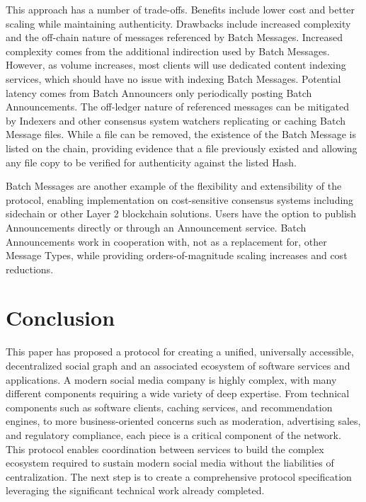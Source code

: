 \documentclass[12pt,letterpaper]{article}
\begin{document}
	This approach has a number of trade-offs. Benefits include lower cost and better
        scaling while maintaining authenticity. Drawbacks include increased complexity and
        the off-chain nature of messages referenced by Batch Messages. Increased complexity
        comes from the additional indirection used by Batch Messages. However, as volume
        increases, most clients will use dedicated content indexing services, which should
        have no issue with indexing Batch Messages. Potential latency comes from Batch
        Announcers only periodically posting Batch Announcements. The off-ledger nature of
        referenced messages can be mitigated by Indexers and other consensus system watchers
        replicating or caching Batch Message files.  While a file can be removed, the
        existence of the Batch Message is listed on the chain, providing evidence that a
        file previously existed and allowing any file copy to be verified for authenticity
        against the listed Hash.

	Batch Messages are another example of the flexibility and extensibility of the
        protocol, enabling implementation on cost-sensitive consensus systems including
        sidechain or other Layer 2 blockchain solutions.  Users have the option to publish
        Announcements directly or through an Announcement service. Batch Announcements work
        in cooperation with, not as a replacement for, other Message Types, while providing
        orders-of-magnitude scaling increases and cost reductions.

\section{Conclusion}\label{sec:conclusion}

This paper has proposed a protocol for creating a unified, universally accessible,
decentralized social graph and an associated ecosystem of software services and
applications. A modern social media company is highly complex, with many different
components requiring a wide variety of deep expertise. From technical components such as
software clients, caching services, and recommendation engines,\cite{hashemi2017} to more
business-oriented concerns such as moderation, advertising sales, and regulatory compliance,
each piece is a critical component of the network. This protocol enables coordination
between services to build the complex ecosystem required to sustain modern social media
without the liabilities of centralization. The next step is to create a comprehensive
protocol specification leveraging the significant technical work already completed.
\end{document}
